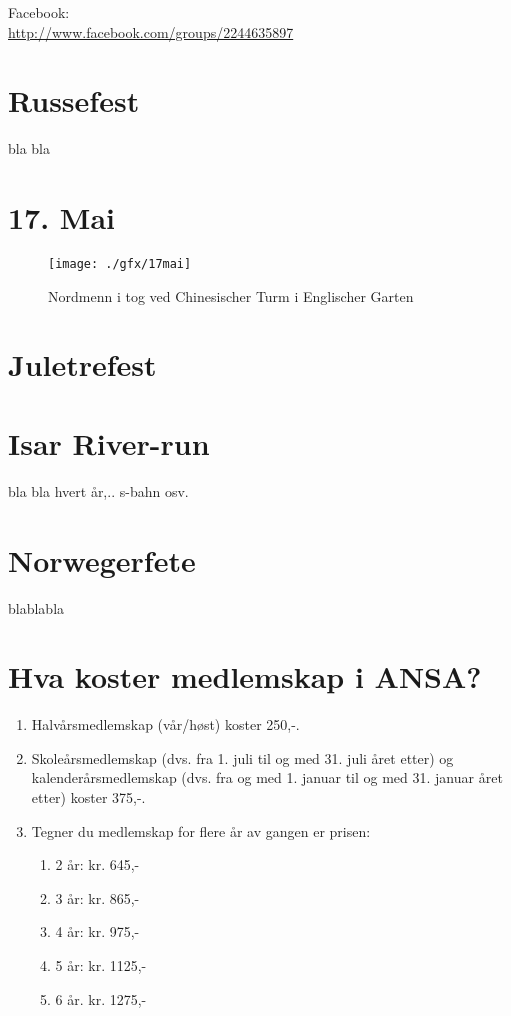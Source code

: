 Facebook:\\
\url{http://www.facebook.com/groups/2244635897}

\section{Russefest}

bla bla

\section{17. Mai}
\begin{figure}[h]
\center
\texttt{[image: ./gfx/17mai]}
\caption{Nordmenn i tog ved Chinesischer Turm i Englischer Garten}
\end{figure}


\section{Juletrefest}


\section{Isar River-run}
bla bla hvert år,.. s-bahn osv.



\section{Norwegerfete}

blablabla




\section{Hva koster medlemskap i ANSA?}

\begin{enumerate}
\item Halvårsmedlemskap (vår/høst) koster 250,-.
\item Skoleårsmedlemskap (dvs. fra 1. juli til og med 31. juli året etter) og kalenderårsmedlemskap (dvs. fra og med 1. januar til og med 31. januar året etter) koster 375,-.
\item Tegner du medlemskap for flere år av gangen er prisen:
\begin{enumerate}
\item 2 år: kr. 645,- 
\item 3 år: kr. 865,-
\item 4 år: kr. 975,-
\item 5 år: kr. 1125,-
\item 6 år. kr. 1275,-
\end{enumerate}
\end{enumerate} 



